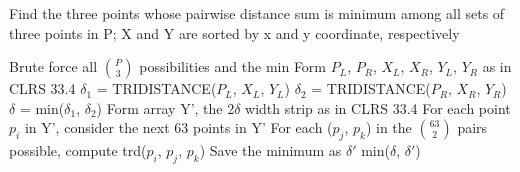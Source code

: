 \documentclass[11pt,a4paper]{article}
\begin{document}

\begin{algorithm}
	\caption{Find the three points whose pairwise distance sum is minimum among all sets of three points in P; X and Y are sorted by x and y coordinate, respectively}
	\begin{algorithmic}[1]
			\State Brute force all $\binom{P}{3}$ possibilities and \Return the min
		\EndIf
		\State Form $P_{L}$, $P_{R}$, $X_{L}$, $X_{R}$, $Y_{L}$, $Y_{R}$ as in CLRS 33.4
		\State $\delta_{1}$ = TRIDISTANCE($P_{L}$, $X_{L}$, $Y_{L}$)
		\State $\delta_{2}$ = TRIDISTANCE($P_{R}$, $X_{R}$, $Y_{R}$)
		\State $\delta$ = min($\delta_{1}$, $\delta_{2}$)
		\State Form array Y', the 2$\delta$ width strip as in CLRS 33.4
		\State For each point $p_{i}$ in Y', consider the next 63 points in Y'
		\State For each ($p_{j}$, $p_{k}$) in the $\binom{63}{2}$ pairs possible, compute trd($p_{i}$, $p_{j}$, $p_{k}$)
		\State Save the minimum as $\delta'$
		\State \Return min($\delta$, $\delta'$)
	\EndFunction
	\end{algorithmic}
	\end{algorithm}
\end{document}
